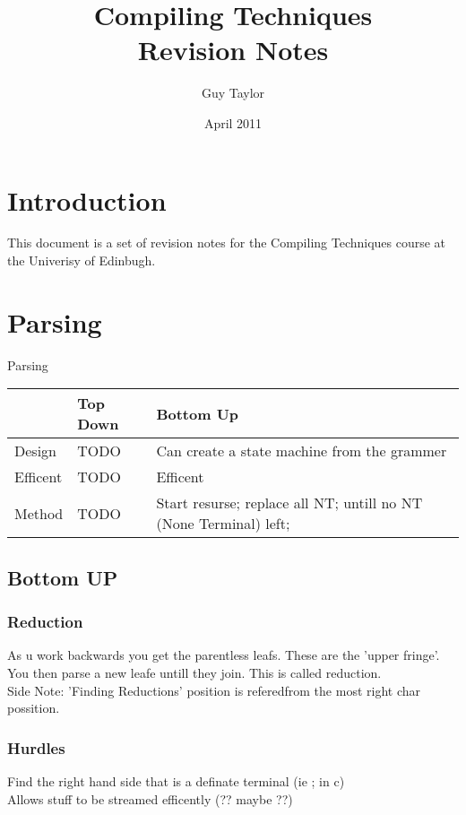 \documentclass[11pt,twoside,a4paper]{article}
\begin{document}
  
  \title{Compiling Techniques \\Revision Notes}
  \author{Guy Taylor}
  \date{April 2011}
  
  \maketitle
  
  \tableofcontents
  
  \section{Introduction}
    This document is a set of revision notes for the Compiling Techniques\textsuperscript{\cite{ct_home}} course at the Univerisy of Edinbugh.
  
  \clearpage
  \section{Parsing}
    Parsing
    
    \begin{center}\begin{tabular}{l|l|l}
       & Top Down & Bottom Up \\ \hline
      Design & TODO & Can create a state machine from the grammer \\
      Efficent & TODO & Efficent \\
      Method & TODO & Start resurse; replace all NT; untill no NT (None Terminal) left; \\
    \end{tabular}\end{center}
    
    \subsection{Bottom UP}
      \subsubsection{Reduction}
      As u work backwards you get the parentless leafs. These are the 'upper fringe'. You then parse a new leafe untill they join. This is called reduction. \\
      Side Note: 'Finding Reductions' position is referedfrom the most right char possition.
      
      \subsubsection{Hurdles}
        Find the right hand side that is a definate terminal (ie ; in c) \\
        Allows stuff to be streamed efficently (?? maybe ??)
      
\end{document}
